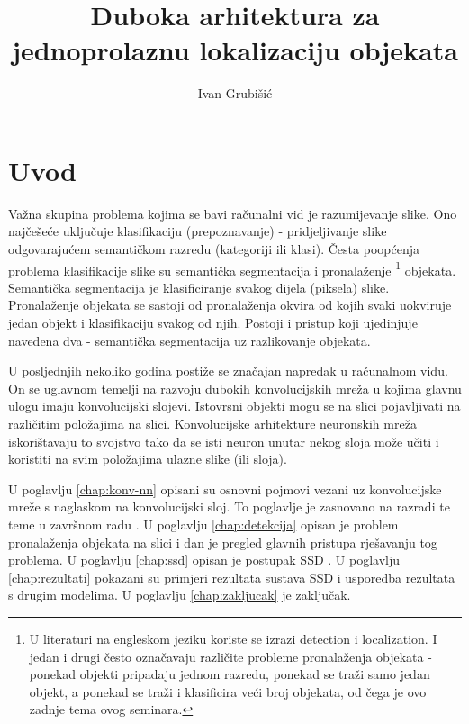 \documentclass[utf8, seminar, numeric, lmodern]{feri}
\begin{document}


\title{Duboka arhitektura za jednoprolaznu lokalizaciju objekata}

\author{Ivan Grubišić}

\maketitle

\thispagestyle{empty}
\clearpage
{
	\hypersetup{linkcolor=black}
	\tableofcontents
}



\chapter{Uvod}
Važna skupina problema kojima se bavi računalni vid je razumijevanje slike. Ono najčešeće uključuje klasifikaciju (prepoznavanje) - pridjeljivanje slike odgovarajućem semantičkom razredu (kategoriji ili klasi). Česta poopćenja problema klasifikacije slike su semantička segmentacija i pronalaženje \footnote{U literaturi na engleskom jeziku koriste se izrazi detection i localization. I jedan i drugi često	označavaju različite probleme pronalaženja objekata - ponekad objekti pripadaju jednom razredu, ponekad se traži samo jedan objekt, a ponekad se traži i klasificira veći broj objekata, od čega je ovo zadnje tema ovog seminara.} objekata. Semantička segmentacija je klasificiranje svakog dijela (piksela) slike. Pronalaženje objekata se sastoji od pronalaženja okvira od kojih svaki uokviruje jedan objekt i klasifikaciju svakog od njih. Postoji i pristup koji ujedinjuje navedena dva - semantička segmentacija uz razlikovanje objekata. 

U posljednjih nekoliko godina postiže se značajan napredak u računalnom vidu. On se uglavnom temelji na razvoju dubokih konvolucijskih mreža u kojima glavnu ulogu imaju konvolucijski slojevi. Istovrsni objekti mogu se na slici pojavljivati na različitim položajima na slici. Konvolucijske arhitekture neuronskih mreža iskorištavaju to svojstvo tako da se isti neuron unutar nekog sloja može učiti i koristiti na svim položajima ulazne slike (ili sloja).

U poglavlju \ref{chap:konv-nn} opisani su osnovni pojmovi vezani uz konvolucijske mreže s naglaskom na konvolucijski sloj. To poglavlje je zasnovano na razradi te teme u završnom radu \cite{semseg-ja}. U poglavlju \ref{chap:detekcija} opisan je problem pronalaženja objekata na slici i dan je pregled glavnih pristupa rješavanju tog problema. U poglavlju \ref{chap:ssd} opisan je postupak SSD \cite{ssd}. U poglavlju \ref{chap:rezultati} pokazani su primjeri rezultata sustava SSD i usporedba rezultata s drugim modelima. U poglavlju \ref{chap:zakljucak} je zaključak.
\end{document}
